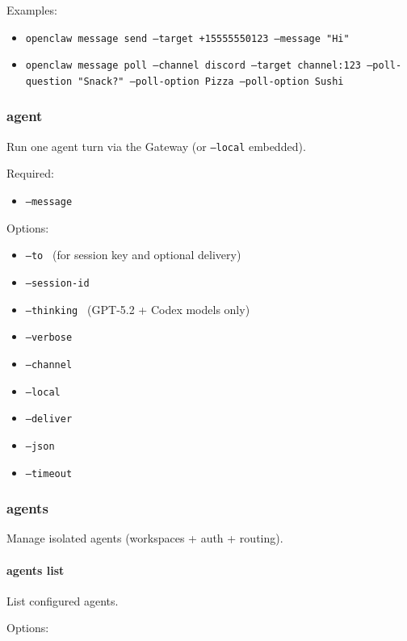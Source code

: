 Examples:

\begin{itemize}
  \item \texttt{openclaw message send --target +15555550123 --message "Hi"}
  \item \texttt{openclaw message poll --channel discord --target channel:123 --poll-question "Snack?" --poll-option Pizza --poll-option Sushi}
\end{itemize}


\subsubsection{agent}


Run one agent turn via the Gateway (or \texttt{--local} embedded).

Required:

\begin{itemize}
  \item \texttt{--message }
\end{itemize}


Options:

\begin{itemize}
  \item \texttt{--to } (for session key and optional delivery)
  \item \texttt{--session-id }
  \item \texttt{--thinking } (GPT-5.2 + Codex models only)
  \item \texttt{--verbose }
  \item \texttt{--channel }
  \item \texttt{--local}
  \item \texttt{--deliver}
  \item \texttt{--json}
  \item \texttt{--timeout }
\end{itemize}


\subsubsection{agents}


Manage isolated agents (workspaces + auth + routing).

\paragraph{agents list}


List configured agents.

Options:

